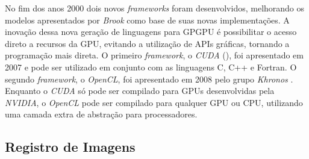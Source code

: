   No fim dos anos 2000 dois novos \textit{frameworks} foram desenvolvidos,
melhorando os modelos apresentados por \textit{Brook} como base de suas novas
implementações. A inovação dessa nova geração de linguagens para GPGPU é
possibilitar o acesso direto a recursos da GPU, evitando a utilização de
APIs gráficas, tornando a programação mais direta. O primeiro \textit{framework},
o \textit{CUDA} (\cite{nvidia2007compute}), foi apresentado em 2007 e pode ser
utilizado em conjunto com as linguagens C, C++ e Fortran. O segundo
\textit{framework}, o \textit{OpenCL}, foi apresentado em 2008 pelo grupo
\textit{Khronos} \cite{khronos2008opencl}. Enquanto o \textit{CUDA} só pode ser
compilado para GPUs desenvolvidas pela \textit{NVIDIA}, o \textit{OpenCL}
pode ser compilado para qualquer GPU ou CPU, utilizando uma camada extra de
abstração para processadores.

\subsection{Registro de Imagens}


